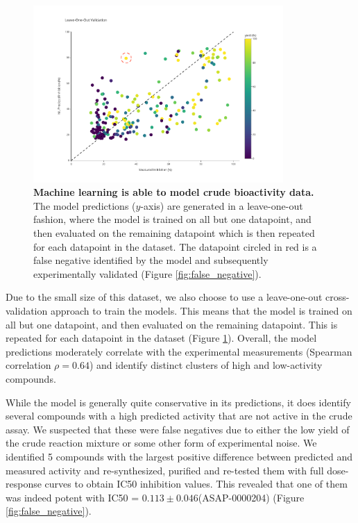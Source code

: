 \begin{figure}[!t]
 \centering
 \includegraphics[width=0.85\textwidth]{Chapters/Crude/Figs/rf_loo_flat.pdf}
 \caption{\textbf{Machine learning is able to model crude bioactivity data.} The model predictions ($y$-axis) are generated in a leave-one-out fashion, where the model is trained on all but one datapoint, and then evaluated on the remaining datapoint which is then repeated for each datapoint in the dataset. The datapoint circled in red is a false negative identified by the model and subsequently experimentally validated (Figure \ref{fig:false_negative}).}
 \label{fig:leave-one-out}
\end{figure}

Due to the small size of this dataset, we also choose to use a leave-one-out cross-validation approach to train the models. This means that the model is trained on all but one datapoint, and then evaluated on the remaining datapoint. This is repeated for each datapoint in the dataset (Figure \ref{fig:leave-one-out}). Overall, the model predictions moderately correlate with the experimental measurements (Spearman correlation $\rho =0.64$) and identify distinct clusters of high and low-activity compounds. 

While the model is generally quite conservative in its predictions, it does identify several compounds with a high predicted activity that are not active in the crude assay. We suspected that these were false negatives due to either the low yield of the crude reaction mixture or some other form of experimental noise. We identified 5 compounds with the largest positive difference between predicted and measured activity and re-synthesized, purified and re-tested them with full dose-response curves to obtain IC50 inhibition values. This revealed that one of them was indeed potent with IC50 = $0.113\pm0.046$\uM (ASAP-0000204) (Figure \ref{fig:false_negative}).

